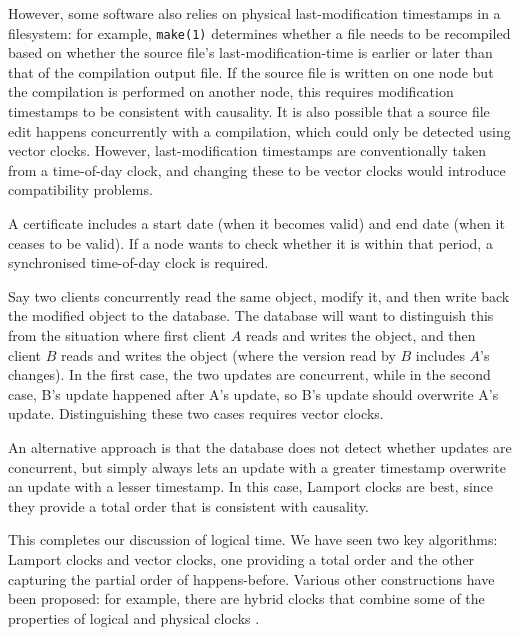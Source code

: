 {\begin{description}
            However, some software also relies on physical last-modification timestamps in a filesystem: for example, \texttt{make(1)} determines whether a file needs to be recompiled based on whether the source file's last-modification-time is earlier or later than that of the compilation output file.
            If the source file is written on one node but the compilation is performed on another node, this requires modification timestamps to be consistent with causality.
            It is also possible that a source file edit happens concurrently with a compilation, which could only be detected using vector clocks.
            However, last-modification timestamps are conventionally taken from a time-of-day clock, and changing these to be vector clocks would introduce compatibility problems.
        \item [Cryptographic certificate validity:]
            A certificate includes a start date (when it becomes valid) and end date (when it ceases to be valid).
            If a node wants to check whether it is within that period, a synchronised time-of-day clock is required.
        \item [Concurrent database updates:]
            Say two clients concurrently read the same object, modify it, and then write back the modified object to the database.
            The database will want to distinguish this from the situation where first client $A$ reads and writes the object, and then client $B$ reads and writes the object (where the version read by $B$ includes $A$'s changes).
            In the first case, the two updates are concurrent, while in the second case, B's update happened after A's update, so B's update should overwrite A's update.
            Distinguishing these two cases requires vector clocks.

            An alternative approach is that the database does not detect whether updates are concurrent, but simply always lets an update with a greater timestamp overwrite an update with a lesser timestamp.
            In this case, Lamport clocks are best, since they provide a total order that is consistent with causality.
    \end{description}
}

This completes our discussion of logical time.
We have seen two key algorithms: Lamport clocks and vector clocks, one providing a total order and the other capturing the partial order of happens-before.
Various other constructions have been proposed: for example, there are hybrid clocks that combine some of the properties of logical and physical clocks \citep{Kulkarni:2014}.

